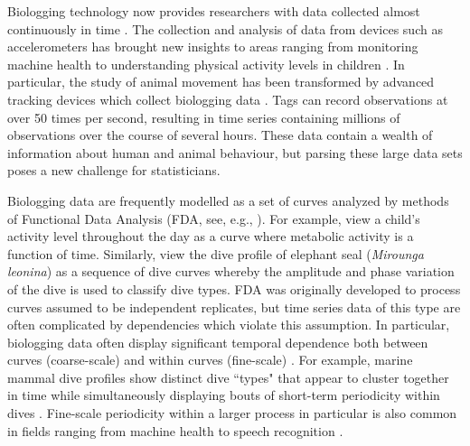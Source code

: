 
Biologging technology now provides researchers with data collected almost continuously in time \citep{Hooten:2017}.
The collection and analysis of data from devices such as accelerometers has brought new insights to areas ranging from monitoring machine health \citep{Getman:2009} to understanding physical activity levels in children \citep{Morris:2007}. In particular, the study of animal movement has been transformed by advanced tracking devices which collect biologging data \citep{Borger:2020}. Tags can record observations at over 50 times per second, resulting in time series containing millions of observations over the course of several hours. These data contain a wealth of information about human and animal behaviour, but parsing these large data sets poses a new challenge for statisticians.

Biologging data are frequently modelled as a set of curves analyzed by methods of Functional Data Analysis (FDA, see, e.g., \citet{Ramsay:2005}). For example, \citet{Morris:2007} view a child's activity level throughout the day as a curve where metabolic activity is a function of time. Similarly, \citet{Fu:2017} view the dive profile of elephant seal (\textit{Mirounga leonina}) as a sequence of dive curves whereby the amplitude and phase variation of the dive is used to classify dive types.
%
FDA was originally developed to process curves assumed to be independent replicates, but time series data of this type are often complicated by dependencies which violate this assumption. In particular, biologging data often display significant temporal dependence both between curves (coarse-scale) and within curves (fine-scale) \citep{Barajas:2017}.
For example, marine mammal dive profiles show distinct dive ``types" that appear to cluster together in time  \citep{Tennessen:2019b} while simultaneously displaying bouts of short-term periodicity within dives \citep{Adam:2019}. Fine-scale periodicity within a larger process in particular is also common in fields ranging from machine health \citep{Xin:2018,Lucero:2019} to speech recognition \citep{Juang:1991}.


